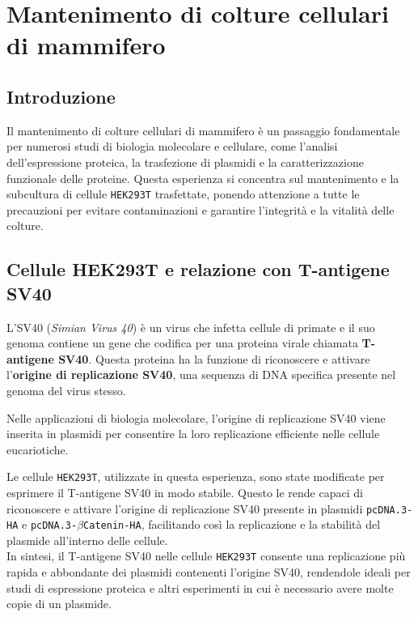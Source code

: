 \section {Mantenimento di colture cellulari di mammifero}

\subsection{Introduzione}
Il mantenimento di colture cellulari di mammifero è un passaggio fondamentale per numerosi studi di biologia molecolare e cellulare, come l’analisi dell’espressione proteica, la trasfezione di plasmidi e la caratterizzazione funzionale delle proteine. Questa esperienza si concentra sul mantenimento e la subcultura di cellule \texttt{HEK293T} trasfettate, ponendo attenzione a tutte le precauzioni per evitare contaminazioni e garantire l’integrità e la vitalità delle colture.

\subsection{Cellule HEK293T e relazione con T-antigene SV40}

L’SV40 (\textit{Simian Virus 40}) è un virus che infetta cellule di primate e il suo genoma contiene un gene che codifica per una proteina virale chiamata \textbf{T-antigene SV40}.  
Questa proteina ha la funzione di riconoscere e attivare l’\textbf{origine di replicazione SV40}, una sequenza di DNA specifica presente nel genoma del virus stesso.

Nelle applicazioni di biologia molecolare, l’origine di replicazione SV40 viene inserita in plasmidi per consentire la loro replicazione efficiente nelle cellule eucariotiche.  

Le cellule \texttt{HEK293T}, utilizzate in questa esperienza, sono state modificate per esprimere il T-antigene SV40 in modo stabile. Questo le rende capaci di riconoscere e attivare l’origine di replicazione SV40 presente in plasmidi \texttt{pcDNA.3-HA} e \texttt{pcDNA.3-$\beta$Catenin-HA}, facilitando così la replicazione e la stabilità del plasmide all’interno delle cellule.
\vspace{0.25em}\\
In sintesi, il T-antigene SV40 nelle cellule \texttt{HEK293T} consente una replicazione più rapida e abbondante dei plasmidi contenenti l’origine SV40, rendendole ideali per studi di espressione proteica e altri esperimenti in cui è necessario avere molte copie di un plasmide.

